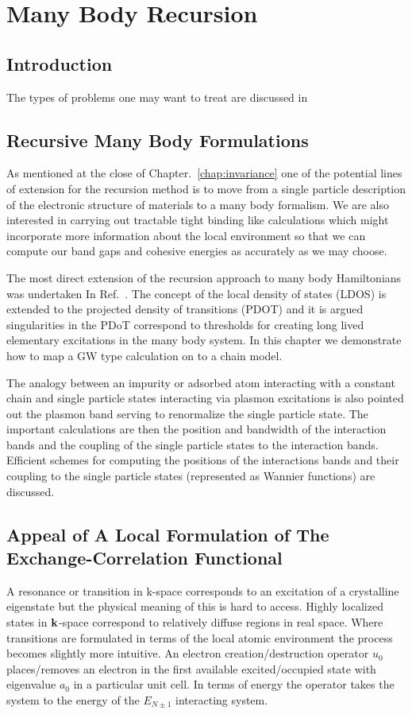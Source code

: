\chapter{Many Body Recursion}
\section{Introduction}

The types of problems one may want to treat are discussed in \cite{slater49, kittel54}

\section{Recursive Many Body Formulations}
As mentioned at the close of Chapter.~\ref{chap:invariance} one of the potential
lines of extension for the recursion method is to move from a single particle 
description of the electronic structure of materials to a many body formalism.
We are also interested in carrying out tractable tight binding like calculations
which might incorporate more information about the local environment so that we
can compute our band gaps and cohesive energies as accurately as we may choose.

The most direct extension of the recursion approach to many body Hamiltonians 
was undertaken In Ref.~\cite{annett94}. The concept of the local density of states (LDOS)
is extended to the projected density of transitions (PDOT) and it is argued singularities
in the PDoT correspond to thresholds for creating long lived elementary excitations 
in the many body system. In this chapter we demonstrate how to map a GW type calculation
on to a chain model. 

The analogy between an impurity or adsorbed atom interacting with
a constant chain and single particle states interacting via plasmon excitations is 
also pointed out the plasmon band serving to renormalize the single particle state.
The important calculations are then the position and bandwidth of the interaction
bands and the coupling of the single particle states to the interaction bands.
Efficient schemes for computing the positions of the interactions bands and 
their coupling to the single particle states (represented as Wannier functions)
are discussed.

\section{Appeal of A Local Formulation of The Exchange-Correlation Functional}
A resonance or transition in k-space corresponds to an excitation 
of a crystalline eigenstate but the physical meaning of this is hard to access. Highly
localized states in ${\bf k}$-space correspond to relatively diffuse regions in real space. Where
transitions are formulated in terms of the local atomic environment the process becomes slightly
more intuitive. An electron creation/destruction operator $u_{0}$ places/removes an electron in the 
first available excited/occupied state with eigenvalue $a_{0}$ in a particular unit cell. 
In terms of energy the operator takes the system to the energy 
of the $E_{N\pm1}$ interacting system. 

